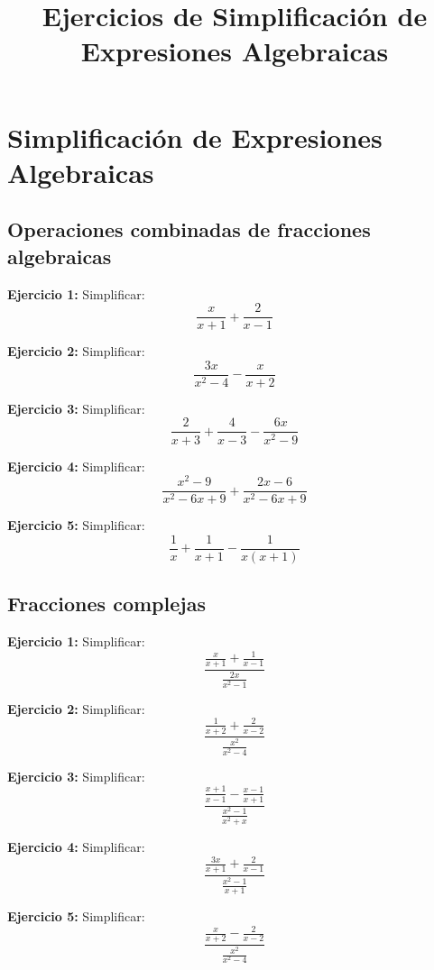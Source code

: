\documentclass{profesor}
\title{Ejercicios de Simplificación de Expresiones Algebraicas}
\begin{document}
\maketitle
\tableofcontents
\newpage

\section{Simplificación de Expresiones Algebraicas}

\subsection{Operaciones combinadas de fracciones algebraicas}

\textbf{Ejercicio 1:}  
Simplificar:
\[
\frac{x}{x+1} + \frac{2}{x-1}
\]

\textbf{Ejercicio 2:}  
Simplificar:
\[
\frac{3x}{x^2 - 4} - \frac{x}{x+2}
\]

\textbf{Ejercicio 3:}  
Simplificar:
\[
\frac{2}{x+3} + \frac{4}{x-3} - \frac{6x}{x^2-9}
\]

\textbf{Ejercicio 4:}  
Simplificar:
\[
\frac{x^2 - 9}{x^2 - 6x + 9} + \frac{2x - 6}{x^2 - 6x + 9}
\]

\textbf{Ejercicio 5:}  
Simplificar:
\[
\frac{1}{x} + \frac{1}{x+1} - \frac{1}{x(x+1)}
\]

\subsection{Fracciones complejas}

\textbf{Ejercicio 1:}  
Simplificar:
\[
\frac{\frac{x}{x+1} + \frac{1}{x-1}}{\frac{2x}{x^2-1}}
\]

\textbf{Ejercicio 2:}  
Simplificar:
\[
\frac{\frac{1}{x+2} + \frac{2}{x-2}}{\frac{x^2}{x^2-4}}
\]

\textbf{Ejercicio 3:}  
Simplificar:
\[
\frac{\frac{x+1}{x-1} - \frac{x-1}{x+1}}{\frac{x^2 - 1}{x^2 + x}}
\]

\textbf{Ejercicio 4:}  
Simplificar:
\[
\frac{\frac{3x}{x+1} + \frac{2}{x-1}}{\frac{x^2 - 1}{x+1}}
\]

\textbf{Ejercicio 5:}  
Simplificar:
\[
\frac{\frac{x}{x+2} - \frac{2}{x-2}}{\frac{x^2}{x^2 - 4}}
\]
\end{document}
